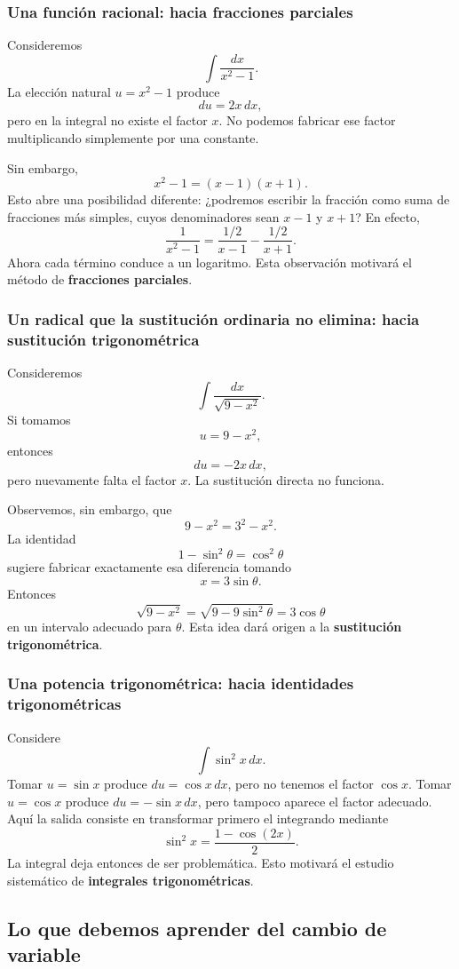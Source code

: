 \documentclass[12pt]{article}
\theoremstyle{definition}\newtheorem{definicion}[teorema]{Definición}\newtheorem{ejemplo}[teorema]{Ejemplo}\newtheorem{ejercicio}[teorema]{Ejercicio}
\theoremstyle{remark}\newtheorem*{observacion}{Observación}\newtheorem*{advertencia}{Advertencia}\newtheorem*{estrategia}{Estrategia}
\begin{document}
\subsubsection*{Una función racional: hacia fracciones parciales}

Consideremos
\[
\int\frac{dx}{x^2-1}.
\]
La elección natural $u=x^2-1$ produce
\[
du=2x\,dx,
\]
pero en la integral no existe el factor $x$. No podemos fabricar ese factor multiplicando simplemente por una constante.

Sin embargo,
\[
x^2-1=(x-1)(x+1).
\]
Esto abre una posibilidad diferente: ¿podremos escribir la fracción como suma de fracciones más simples, cuyos denominadores sean $x-1$ y $x+1$? En efecto,
\[
\frac1{x^2-1}
=\frac{1/2}{x-1}-\frac{1/2}{x+1}.
\]
Ahora cada término conduce a un logaritmo. Esta observación motivará el método de \textbf{fracciones parciales}.

\subsubsection*{Un radical que la sustitución ordinaria no elimina: hacia sustitución trigonométrica}

Consideremos
\[
\int\frac{dx}{\sqrt{9-x^2}}.
\]
Si tomamos
\[
u=9-x^2,
\]
entonces
\[
du=-2x\,dx,
\]
pero nuevamente falta el factor $x$. La sustitución directa no funciona.

Observemos, sin embargo, que
\[
9-x^2=3^2-x^2.
\]
La identidad
\[
1-\sin^2\theta=\cos^2\theta
\]
sugiere fabricar exactamente esa diferencia tomando
\[
x=3\sin\theta.
\]
Entonces
\[
\sqrt{9-x^2}
=\sqrt{9-9\sin^2\theta}
=3\cos\theta
\]
en un intervalo adecuado para $\theta$. Esta idea dará origen a la \textbf{sustitución trigonométrica}.

\subsubsection*{Una potencia trigonométrica: hacia identidades trigonométricas}

Considere
\[
\int\sin^2x\,dx.
\]
Tomar $u=\sin x$ produce $du=\cos x\,dx$, pero no tenemos el factor $\cos x$. Tomar $u=\cos x$ produce $du=-\sin x\,dx$, pero tampoco aparece el factor adecuado. Aquí la salida consiste en transformar primero el integrando mediante
\[
\sin^2x=\frac{1-\cos(2x)}2.
\]
La integral deja entonces de ser problemática. Esto motivará el estudio sistemático de \textbf{integrales trigonométricas}.

\subsection{Lo que debemos aprender del cambio de variable}
\end{document}
